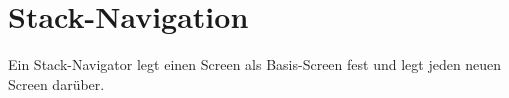 \section{Stack-Navigation}
Ein Stack-Navigator legt einen Screen als Basis-Screen fest und legt jeden neuen Screen darüber.





